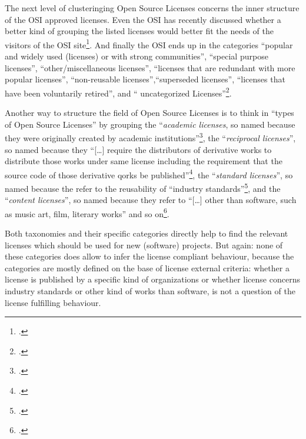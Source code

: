 The next level of clusteringing Open Source Licenses concerns the inner
structure of the OSI approved licenses. Even the OSI has recently discussed
whether a better kind of grouping the listed licenses would better fit the needs
of the visitors of the OSI site\footcite[cf.][\nopage wp]{OSI2013a}. And finally
the OSI ends up in the categories \enquote{popular and widely used (licenses) or
with strong communities}, \enquote{special purpose licenses},
\enquote{other/miscellaneous licenses}, \enquote{licenses that are redundant
with more popular licenses}, \enquote{non-reusable licenses},\enquote{superseded
licenses}, \enquote{licenses that have been voluntarily retired}, and \enquote{
uncategorized Licenses}\footcite[cf.][\nopage wp]{OSI2013b}.

Another way to structure the field of Open Source Licenses is to think in
\enquote{types of Open Source Licenses} by grouping the \enquote{\emph{academic
licenses}, so named because they were originally created by academic
institutions}\footcite[cf.][69]{Rosen2005a}, the \enquote{\emph{reciprocal
licenses}}, so named because they \enquote{[\ldots] require the distributors of
derivative works to distribute those works under same license including the
requirement that the source code of those derivative qorks be
published}\footcite[cf.][70]{Rosen2005a}, the \enquote{\emph{standard
licenses}}, so named because the refer to the reusability of \enquote{industry
standards}\footcite[cf.][70]{Rosen2005a}, and the \enquote{\emph{content
licenses}}, so named because they refer to
\enquote{[\ldots] other than software, such as music art, film, literary works}
and so on\footcite[cf.][71]{Rosen2005a}.

Both taxonomies and their specific categories directly help to find the relevant
licenses which should be used for new (software) projects. But again: none of
these categories does allow to infer the license compliant behaviour, because
the categories are mostly defined on the base of license external criteria:
whether a license is published by a specific kind of organizations or whether
license concerns industry standards or other kind of works than software, is not
a question of the license fulfilling behaviour.

